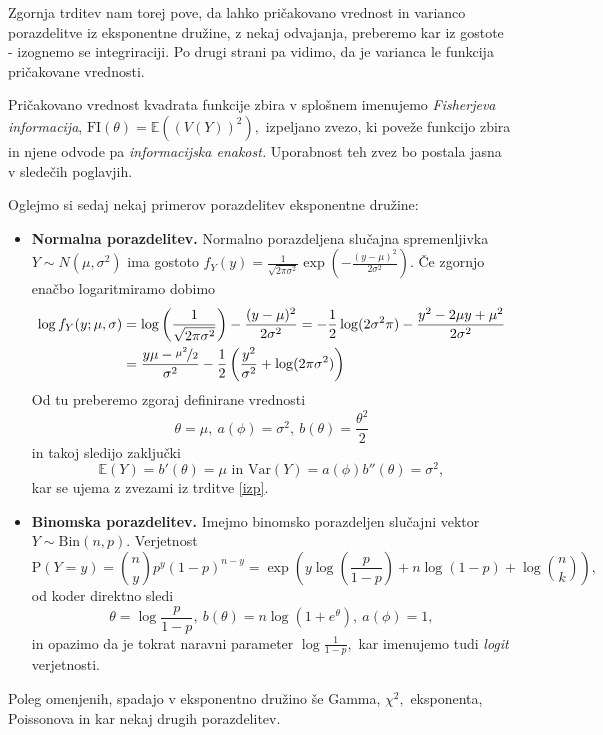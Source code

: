 \documentclass[12pt,a4paper]{amsart}
\theoremstyle{definition} %
\theoremstyle{plain} %
\begin{document}
Zgornja trditev nam torej pove, da lahko pričakovano vrednost in varianco porazdelitve iz eksponentne družine, z nekaj odvajanja, preberemo kar iz gostote - izognemo se integriraciji. Po drugi
strani pa vidimo, da je varianca le funkcija pričakovane vrednosti. 

Pričakovano vrednost kvadrata funkcije zbira v splošnem imenujemo \textit{Fisherjeva informacija}, $\mathrm{FI}(\theta) = \mathbb{E}((V(Y))^2),$ izpeljano zvezo, ki poveže funkcijo zbira in njene odvode pa \textit{informacijska enakost.}
Uporabnost teh zvez bo postala jasna v sledečih poglavjih.

Oglejmo si sedaj nekaj primerov porazdelitev eksponentne družine:
\begin{itemize}
    \item \textbf{Normalna porazdelitev.} Normalno porazdeljena slučajna spremenljivka $Y \sim N(\mu, \sigma^2)$
    ima gostoto $f_{Y}(y) = \frac{1}{\sqrt{2\pi\sigma^2}}\exp{\left(-\frac{(y-\mu)^2}{2\sigma^2}\right)}.$
    Če zgornjo enačbo logaritmiramo dobimo
    \begin{align*}
        \log f_{Y}(y;\mu, \sigma) &= \log\left(\frac{1}{\sqrt{2\pi\sigma^2}}\right) -\frac{(y-\mu)^2}{2\sigma^2} = -\frac{1}{2}\log(2\sigma^2\pi) - \frac{y^2 - 2\mu y + \mu^2}{2 \sigma^2}    \\ \nonumber
                            &= \frac{y\mu-\nicefrac{\mu^2}{2}}{\sigma^2} - \frac{1}{2}\left(\frac{y^2}{\sigma^2} + \log(2\pi\sigma^2)\right) 
    \end{align*}
    Od tu preberemo zgoraj definirane vrednosti
    \[
        \theta = \mu,~a(\phi) = \sigma^2,~b(\theta) = \frac{\theta^2}{2}
    \]
    in takoj sledijo zaključki
    \[
        \mathbb{E}(Y) = b'(\theta) = \mu \text{ in } \mathrm{Var}(Y) = a(\phi)b''(\theta) = \sigma^2,
    \]
    kar se ujema z zvezami iz trditve \ref{izp}.

    \item \textbf{Binomska porazdelitev.} Imejmo binomsko porazdeljen slučajni vektor $Y \sim \mathrm{Bin}(n,p).$ Verjetnost 
    \[
        \mathrm{P}(Y = y) = \binom{n}{y}p^y(1-p)^{n-y} = \exp\left(y\log(\frac{p}{1-p}) + n\log(1-p) + \log{\binom{n}{k}}\right),
    \]
    od koder direktno sledi
    \[
        \theta = \log\frac{p}{1-p},~b(\theta) = n\log(1 + e^{\theta}),~a(\phi) = 1,
    \]
    in opazimo da je tokrat naravni parameter $\log\frac{1}{1-p},$ kar imenujemo tudi \textit{logit} verjetnosti.
\end{itemize}

Poleg omenjenih, spadajo v eksponentno družino še Gamma, $\chi^2,$ eksponenta, Poissonova in kar nekaj drugih porazdelitev.
\end{document}
